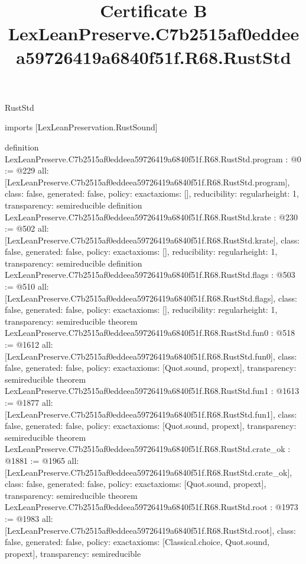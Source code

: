\begin{lexlean}{RustStd}
\title{Certificate B LexLeanPreserve.C7b2515af0eddeea59726419a6840f51f.R68.RustStd}
\begin{coremodule}
imports [LexLeanPreservation.RustSound]

definition LexLeanPreserve.C7b2515af0eddeea59726419a6840f51f.R68.RustStd.program : @0 := @229 {
  all: [LexLeanPreserve.C7b2515af0eddeea59726419a6840f51f.R68.RustStd.program],
  class: false,
  generated: false,
  policy: exact{axioms: []},
  reducibility: regular{height: 1},
  transparency: semireducible
}
definition LexLeanPreserve.C7b2515af0eddeea59726419a6840f51f.R68.RustStd.krate : @230 := @502 {
  all: [LexLeanPreserve.C7b2515af0eddeea59726419a6840f51f.R68.RustStd.krate],
  class: false,
  generated: false,
  policy: exact{axioms: []},
  reducibility: regular{height: 1},
  transparency: semireducible
}
definition LexLeanPreserve.C7b2515af0eddeea59726419a6840f51f.R68.RustStd.flags : @503 := @510 {
  all: [LexLeanPreserve.C7b2515af0eddeea59726419a6840f51f.R68.RustStd.flags],
  class: false,
  generated: false,
  policy: exact{axioms: []},
  reducibility: regular{height: 1},
  transparency: semireducible
}
theorem LexLeanPreserve.C7b2515af0eddeea59726419a6840f51f.R68.RustStd.fun0 : @518 := @1612 {
  all: [LexLeanPreserve.C7b2515af0eddeea59726419a6840f51f.R68.RustStd.fun0],
  class: false,
  generated: false,
  policy: exact{axioms: [Quot.sound, propext]},
  transparency: semireducible
}
theorem LexLeanPreserve.C7b2515af0eddeea59726419a6840f51f.R68.RustStd.fun1 : @1613 := @1877 {
  all: [LexLeanPreserve.C7b2515af0eddeea59726419a6840f51f.R68.RustStd.fun1],
  class: false,
  generated: false,
  policy: exact{axioms: [Quot.sound, propext]},
  transparency: semireducible
}
theorem LexLeanPreserve.C7b2515af0eddeea59726419a6840f51f.R68.RustStd.crate_ok : @1881 := @1965 {
  all: [LexLeanPreserve.C7b2515af0eddeea59726419a6840f51f.R68.RustStd.crate_ok],
  class: false,
  generated: false,
  policy: exact{axioms: [Quot.sound, propext]},
  transparency: semireducible
}
theorem LexLeanPreserve.C7b2515af0eddeea59726419a6840f51f.R68.RustStd.root : @1973 := @1983 {
  all: [LexLeanPreserve.C7b2515af0eddeea59726419a6840f51f.R68.RustStd.root],
  class: false,
  generated: false,
  policy: exact{axioms: [Classical.choice, Quot.sound, propext]},
  transparency: semireducible
}


\end{coremodule}
\end{lexlean}
